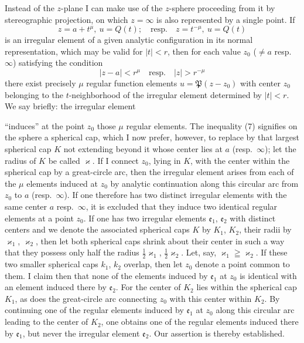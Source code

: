 \documentclass{article}
\begin{document}
Instead of the $z$-plane I can make use of the $z$-sphere proceeding from it by stereographic projection, on which $z = \infty$ is also represented by a single point. If
\[ z = a + t^\mu, \ u = Q(t); \quad \text{resp.} \quad z = t^{-\mu}, \ u = Q(t) \]
is an irregular element of a given analytic configuration in its normal representation, which may be valid for $|t| < r$, then for each value $z_0$ ($\neq a$ resp.\ $\infty$) satisfying the condition
\[ |z - a| < r^\mu \quad \text{resp.} \quad |z| > r^{-\mu} \tag{7} \]
there exist precisely $\mu$ regular function elements $u = \mathfrak{P}(z - z_0)$ with center $z_0$ belonging to the $t$-neighborhood of the irregular element determined by $|t| < r$. We say briefly: the irregular element

``induces'' at the point $z_0$ those $\mu$ regular elements. The inequality (7) signifies on the sphere a spherical cap, which I now prefer, however, to replace by that largest spherical cap $K$ not extending beyond it whose center lies at $a$ (resp.\ $\infty$); let the radius of $K$ be called $\varkappa$. If I connect $z_0$, lying in $K$, with the center within the spherical cap by a great-circle arc, then the irregular element arises from each of the $\mu$ elements induced at $z_0$ by analytic continuation along this circular arc from $z_0$ to $a$ (resp.\ $\infty$). If one therefore has two distinct irregular elements with the same center $a$ resp.\ $\infty$, it is excluded that they induce two identical regular elements at a point $z_0$. If one has two irregular elements $\mathfrak{e}_1$, $\mathfrak{e}_2$ with distinct centers and we denote the associated spherical caps $K$ by $K_1$, $K_2$, their radii by $\varkappa_1$, $\varkappa_2$, then let both spherical caps shrink about their center in such a way that they possess only half the radius $\frac{1}{2}\varkappa_1$, $\frac{1}{2}\varkappa_2$. Let, say, $\varkappa_1 \geqq \varkappa_2$. If these two smaller spherical caps $k_1$, $k_2$ overlap, then let $z_0$ denote a point common to them. I claim then that none of the elements induced by $\mathfrak{e}_1$ at $z_0$ is identical with an element induced there by $\mathfrak{e}_2$. For the center of $K_2$ lies within the spherical cap $K_1$, as does the great-circle arc connecting $z_0$ with this center within $K_2$. By continuing one of the regular elements induced by $\mathfrak{e}_1$ at $z_0$ along this circular arc leading to the center of $K_2$, one obtains one of the regular elements induced there by $\mathfrak{e}_1$, but never the irregular element $\mathfrak{e}_2$. Our assertion is thereby established.
\end{document}
